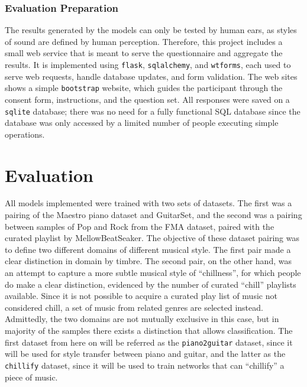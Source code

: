 \documentclass[12pt,a4paper,]{report}
\begin{document}
\hypertarget{evaluation-preparation}{%
\subsection{Evaluation Preparation}\label{evaluation-preparation}}

The results generated by the models can only be tested by human ears, as
styles of sound are defined by human perception. Therefore, this project
includes a small web service that is meant to serve the questionnaire
and aggregate the results. It is implemented using \texttt{flask},
\texttt{sqlalchemy}, and \texttt{wtforms}, each used to serve web
requests, handle database updates, and form validation. The web sites
shows a simple \texttt{bootstrap} website, which guides the participant
through the consent form, instructions, and the question set. All
responses were saved on a \texttt{sqlite} database; there was no need
for a fully functional SQL database since the database was only accessed
by a limited number of people executing simple operations.

\hypertarget{evaluation}{%
\chapter{Evaluation}\label{evaluation}}

All models implemented were trained with two sets of datasets. The first
was a pairing of the Maestro piano dataset and GuitarSet, and the second
was a pairing between samples of Pop and Rock from the FMA dataset,
paired with the curated playlist by MellowBeatSeaker. The objective of
these dataset pairing was to define two different domains of different
musical style. The first pair made a clear distinction in domain by
timbre. The second pair, on the other hand, was an attempt to capture a
more subtle musical style of ``chillness'', for which people do make a
clear distinction, evidenced by the number of curated ``chill''
playlists available. Since it is not possible to acquire a curated play
list of music not considered chill, a set of music from related genres
are selected instead. Admittedly, the two domains are not mutually
exclusive in this case, but in majority of the samples there exists a
distinction that allows classification. The first dataset from here on
will be referred as the \texttt{piano2guitar} dataset, since it will be
used for style transfer between piano and guitar, and the latter as the
\texttt{chillify} dataset, since it will be used to train networks that
can ``chillify'' a piece of music.
\end{document}
